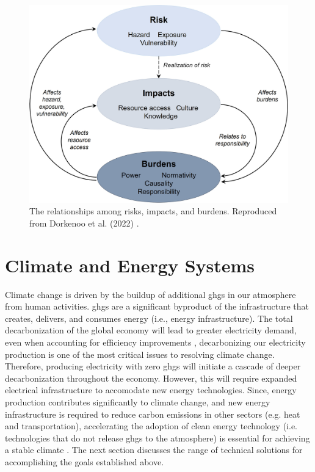 \begin{figure}
    \centering
    \includegraphics[width=\columnwidth]{figures/02_literature_review/dorkenoo-disproportionality.jpg}
    \caption{The relationships among risks, impacts, and burdens. Reproduced
    from Dorkenoo et al. (2022) \cite{dorkenoo_critical_2022}.}
    \label{fig:risk-impact-burden}
\end{figure}



\section{Climate and Energy Systems}

Climate change is driven by the buildup of additional \acp{ghg} in our
atmosphere from human activities. \acp{ghg} are a significant byproduct of the
infrastructure that creates, delivers, and consumes energy (i.e., energy
infrastructure). The total decarbonization of the global economy will lead to
greater electricity demand, even when accounting for efficiency improvements
\cite{national_academies_of_sciences_engineering_and_medicine_accelerating_2021,
mai_electrification_2018}, decarbonizing our electricity production is one of
the most critical issues to resolving climate change. Therefore, producing
electricity with zero \acp{ghg} will initiate a cascade of deeper
decarbonization throughout the economy. However, this will require expanded
electrical infrastructure to accomodate new energy technologies. Since, energy
production contributes significantly to climate change, and new energy
infrastructure is required to reduce carbon emissions in other sectors (e.g.
heat and transportation), accelerating the adoption of clean energy technology
(i.e. technologies that do not release \acp{ghg} to the atmosphere) is essential
for achieving a stable climate \cite{roelfsema_taking_2020,
taylor_managing_2021}. The next section discusses the range of technical
solutions for accomplishing the goals established above.

